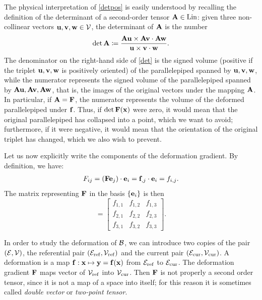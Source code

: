 The physical interpretation of \eqref{detpos} is easily understood by recalling the definition of the determinant of a second-order tensor $\mathbf{A}\in\operatorname{Lin}$: given three non-collinear vectors $\mathbf{u}, \mathbf{v},\mathbf{w}\in \mathcal{V}$, the determinant of $\mathbf{A}$ is the number  
\begin{equation}\label{det}  
	\det \mathbf{A}\coloneqq \frac{\mathbf{A}\mathbf{u}\times\mathbf{A}\mathbf{v}\cdot\mathbf{A}\mathbf{w}}{\mathbf{u}\times\mathbf{v}\cdot\mathbf{w}}.  
\end{equation}  
The denominator on the right-hand side of \eqref{det} is the signed volume (positive if the triplet $\mathbf{u}, \mathbf{v},\mathbf{w}$ is positively oriented) of the parallelepiped spanned by $\mathbf{u}, \mathbf{v},\mathbf{w}$, while the numerator represents the signed volume of the parallelepiped spanned by $\mathbf{A}\mathbf{u}, \mathbf{A}\mathbf{v},\mathbf{A}\mathbf{w}$, that is, the images of the original vectors under the mapping $\mathbf{A}$. In particular, if $\mathbf{A}=\mathbf{F}$, the numerator represents the volume of the deformed parallelepiped under $\mathbf{f}$. Thus, if $\det \mathbf{F}(\mathbf{x})$ were zero, it would mean that the original parallelepiped has collapsed into a point, which we want to avoid; furthermore, if it were negative, it would mean that the orientation of the original triplet has changed, which we also wish to prevent.  

Let us now explicitly write the components of the deformation gradient. By definition, we have:  
\begin{equation}  
	\begin{aligned}  
		F_{ij}=(\mathbf{F}\mathbf{e}_j)\cdot \mathbf{e}_i=\mathbf{f}_{,j}\cdot \mathbf{e}_i=f_{i,j}.  
	\end{aligned}  
\end{equation}  
The matrix representing $\mathbf{F}$ in the basis $\{\mathbf{e}_i\}$ is then  
\begin{equation}  
	[\Fb]=  
	\begin{bmatrix}  
		f_{1,1}&f_{1,2}&f_{1,3}\\f_{2,1}&f_{2,2}&f_{2,3}\\f_{3,1}&f_{3,2}&f_{3,3}  
	\end{bmatrix}.  
\end{equation}  


\begin{remark}
	In order to study the deformation of $\mathcal{B}$, we can introduce two copies of the pair $(\mathcal{E},\mathcal{V})$, the referential pair $(\operatorname{\mathcal{E}_{\textrm ref}}, \operatorname{\mathcal{V}_{\textrm ref}})$ and the current pair $(\operatorname{\mathcal{E}_{\textrm cur}}, \operatorname{\mathcal{V}_{\textrm cur}})$.
	A deformation is a map $\mathbf{f}:\mathbf{x}\mapsto \mathbf{y}=\mathbf{f}(\mathbf{x})$ from $\operatorname{\mathcal{E}_{\textrm ref}}$ to $\operatorname{\mathcal{E}_{\textrm cur}}$.  The deformation gradient $\mathbf{F}$ maps vector of $\operatorname{\mathcal{V}_{\textrm ref}}$ into $\operatorname{\mathcal{V}_{\textrm cur}}$. Then $\mathbf{F}$ is not properly a second order tensor, since it is not a map of a space into itself; for this reason it is sometimes called \textit{double vector} or \textit{two-point tensor}.
\end{remark}

